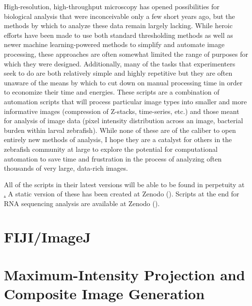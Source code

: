 


High-resolution, high-throughput microscopy has opened possibilities for biological analysis that were inconceivable only a few short years ago, but the methods by which to analyze these data remain largely lacking. While heroic efforts have been made to use both standard thresholding methods as well as newer machine learning-powered methods to simplify and automate image processing, these approaches are often somewhat limited the range of purposes for which they were designed. Additionally, many of the tasks that experimenters seek to do are both relatively simple and highly repetitive but they are often unaware of the means by which to cut down on manual processing time in order to economize their time and energies. These scripts are a combination of automation scripts that will process particular image types into smaller and more informative images (compression of Z-stacks, time-series, etc.) and those meant for analysis of image data (pixel intensity distribution across an image, bacterial burden within larval zebrafish). While none of these are of the caliber to open entirely new methods of analysis, I hope they are a catalyst for others in the zebrafish community at large to explore the potential for computational automation to save time and frustration in the process of analyzing often thousands of very large, data-rich images.

All of the scripts in their latest versions will be able to be found in perpetuity at \href{http://github.com/jaredbrewer/image-analysis}. A static version of these has been created at Zenodo (). Scripts at the end for RNA sequencing analysis are available at Zenodo (). 

\section{FIJI/ImageJ}\label{fiji}



\section{Maximum-Intensity Projection and Composite Image Generation}

